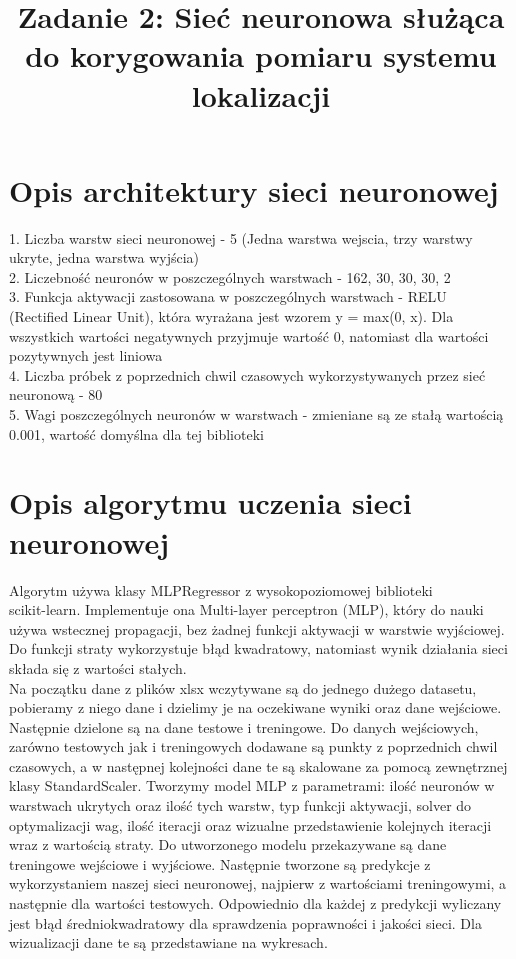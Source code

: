 \documentclass{classrep}
\author{
  \studentinfo{Maciej Pracucik}{216869} \and
  \studentinfo{Adam Jóźwiak}{216786}
}
\title{\textbf{Zadanie 2: Sieć neuronowa służąca do korygowania pomiaru systemu lokalizacji}}
\begin{document}
\maketitle

\section{Opis architektury sieci neuronowej}
{
	1. Liczba warstw sieci neuronowej - 5 (Jedna warstwa wejscia, trzy warstwy ukryte, jedna warstwa wyjścia) \\
	2. Liczebność neuronów w poszczególnych warstwach - 162, 30, 30, 30, 2 \\
	3. Funkcja aktywacji zastosowana w poszczególnych warstwach - RELU \\ (Rectified Linear Unit), która wyrażana jest wzorem y = max(0, x). Dla wszystkich wartości negatywnych przyjmuje wartość 0, natomiast dla wartości pozytywnych jest liniowa \\
	4. Liczba próbek z poprzednich chwil czasowych wykorzystywanych przez sieć neuronową - 80 \\
	5. Wagi poszczególnych neuronów w warstwach - zmieniane są ze stałą wartością 0.001, wartość domyślna dla tej biblioteki \\
 }

\section{Opis algorytmu uczenia sieci neuronowej}
{
	Algorytm używa klasy MLPRegressor z wysokopoziomowej biblioteki \\scikit-learn. Implementuje ona Multi-layer perceptron (MLP), który do nauki używa wstecznej propagacji, bez żadnej 
	funkcji aktywacji w warstwie wyjściowej. Do funkcji straty wykorzystuje błąd kwadratowy, natomiast wynik działania sieci składa się z wartości stałych. \\
	Na początku dane z plików xlsx wczytywane są do jednego dużego datasetu, pobieramy z niego dane i dzielimy je na oczekiwane wyniki oraz dane wejściowe.
	Następnie dzielone są na dane testowe i treningowe.
	Do danych wejściowych, zarówno testowych jak i treningowych dodawane są punkty z poprzednich chwil czasowych, a w następnej kolejności dane te są skalowane za pomocą zewnętrznej klasy StandardScaler. Tworzymy model MLP z parametrami: ilość neuronów w warstwach ukrytych oraz ilość tych warstw, typ funkcji aktywacji, solver do optymalizacji wag, ilość iteracji oraz wizualne 		przedstawienie kolejnych iteracji wraz z wartością straty. Do utworzonego modelu przekazywane są dane treningowe wejściowe i wyjściowe. Następnie tworzone są predykcje z wykorzystaniem naszej sieci neuronowej, najpierw z wartościami treningowymi, a następnie dla wartości testowych. Odpowiednio dla  każdej z predykcji wyliczany jest błąd średniokwadratowy dla sprawdzenia 			poprawności i jakości sieci. Dla wizualizacji dane te są przedstawiane na wykresach.
}
\end{document}
